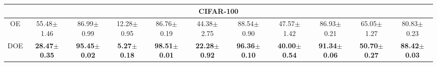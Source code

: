 \documentclass{article} \usepackage{iclr2022_conference,times}
\def\1{\bm{1}}
\begin{document}
\begin{table}[t]
{\begin{tabular}{c|cccccccccc}
\midrule[0.6pt]
\multicolumn{11}{c}{CIFAR-100} \\
\midrule[0.6pt]
OE          & \makecell{55.48$\pm$\\1.46} & \makecell{86.99$\pm$\\0.99} & \makecell{12.28$\pm$\\0.95} & \makecell{86.76$\pm$\\0.19} & \makecell{44.38$\pm$\\2.75} & \makecell{88.54$\pm$\\0.90} & \makecell{47.57$\pm$\\1.42} & \makecell{86.93$\pm$\\0.21} & \makecell{65.05$\pm$\\1.27} & \makecell{80.83$\pm$\\0.23} \\
DOE         & \makecell{\textbf{28.47$\pm$}\\\textbf{0.35}} & \makecell{\textbf{95.45$\pm$}\\\textbf{0.02}} & \makecell{\textbf{5.27$\pm$}\\\textbf{0.18}} & \makecell{\textbf{98.51$\pm$}\\\textbf{0.01}} & \makecell{\textbf{22.28$\pm$}\\\textbf{0.92}} & \makecell{\textbf{96.36$\pm$}\\\textbf{0.10}} & \makecell{\textbf{40.00$\pm$}\\\textbf{0.54}} & \makecell{\textbf{91.34$\pm$}\\\textbf{0.06}} & \makecell{\textbf{50.70$\pm$}\\\textbf{0.27}} & \makecell{\textbf{88.42$\pm$}\\\textbf{0.03}} \\
\bottomrule[1.5pt]   
\end{tabular}}
\end{table}
\end{document}
